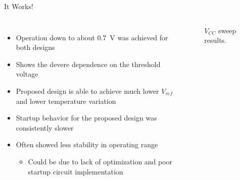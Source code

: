 \documentclass[aspectratio=1610]{beamer} %
\begin{document}
\begin{frame}{It Works!}{}

    \begin{columns}[c]
        \begin{itemize}
            \item Operation down to about \qty{0.7}{\V} was achieved for both designs
            \item Shows the devere dependence on the threshold voltage
            \item Proposed design is able to achieve much lower \(V_{ref}\) and lower temperature variation
            \item Startup behavior for the proposed design was consistently slower
            \item Often showed less stability in operating range
            \begin{itemize}
                \item Could be due to lack of optimization and poor startup circuit implementation
            \end{itemize}
        \end{itemize}

        \begin{figure}[!t]
            \centering
            \datatable
            \vspace{-6pt}
            \caption{\(V_{CC}\) sweep results.}\label{fig:gpdk_bandgap_results}
        \end{figure}
    \end{columns}
\end{frame}
\end{document}
